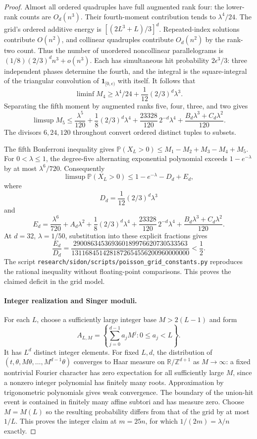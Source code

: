 \documentclass[11pt]{article}
\theoremstyle{definition}
\theoremstyle{remark}
\newcommand{\T}{\mathbb R/\mathbb Z}
\newcommand{\Prob}{\mathbb P}
\begin{document}
\begin{proof}
Almost all ordered quadruples have full augmented rank four: the
lower-rank counts are $O_d(n^3)$. Their fourth-moment contribution
tends to $\lambda^4/24$. The grid's ordered additive energy is
$[(2L^3+L)/3]^d$. Repeated-index solutions contribute $O(n^2)$,
and collinear quadruples contribute $O_d(n^2)$ by the rank-two count.
Thus the number of unordered noncollinear parallelograms is
$(1/8)(2/3)^d n^3+o(n^3)$. Each has simultaneous hit probability
$2\epsilon^3/3$: three independent phases determine the fourth, and
the integral is the square-integral of the triangular convolution of
$\mathbf1_{[0,\epsilon)}$ with itself. It follows that
\[
\liminf M_4\ge\lambda^4/24+
\frac1{12}(2/3)^d\lambda^3.
\]
Separating the fifth moment by augmented ranks five, four, three,
and two gives
\[
\limsup M_5\le\frac{\lambda^5}{120}
+\frac18(2/3)^d\lambda^4
+\frac{23328}{120}\,2^{-d}\lambda^4
+\frac{B_d\lambda^3+C_d\lambda^2}{120}.
\]
The divisors $6,24,120$ throughout convert ordered distinct tuples
to subsets.

The fifth Bonferroni inequality gives
$\Prob(X_L>0)\le M_1-M_2+M_3-M_4+M_5$.
For $0<\lambda\le1$, the degree-five alternating exponential
polynomial exceeds $1-e^{-\lambda}$ by at most $\lambda^6/720$.
Consequently
\[
\limsup\Prob(X_L>0)\le1-e^{-\lambda}-D_d+E_d,
\]
where
\[
D_d=\frac1{12}(2/3)^d\lambda^3
\]
and
\[
E_d=\frac{\lambda^6}{720}+A_d\lambda^2
+\frac18(2/3)^d\lambda^4
+\frac{23328}{120}\,2^{-d}\lambda^4
+\frac{B_d\lambda^3+C_d\lambda^2}{120}.
\]
At $d=32$, $\lambda=1/50$, substitution into these explicit fractions gives
\[
\frac{E_d}{D_d}
=\frac{290086345369360189976620730533563}
{1311684514281872654556200960000000}
<\frac12.
\]
The script \texttt{research/sidon/scripts/poisson\_grid\_constants.py}
reproduces the rational inequality without floating-point comparisons.
This proves the claimed deficit in the grid model.

\paragraph{Integer realization and Singer moduli.}
For each $L$, choose a sufficiently large integer base $M>2(L-1)$
and form
\[
A_{L,M}=\left\{\sum_{j=0}^{d-1}a_jM^j:0\le a_j<L\right\}.
\]
It has $L^d$ distinct integer elements. For fixed $L,d$, the
distribution of $(t,\theta,M\theta,\ldots,M^{d-1}\theta)$ converges
to Haar measure on $\T^{d+1}$ as $M\to\infty$: a fixed nontrivial
Fourier character has zero expectation for all sufficiently large
$M$, since a nonzero integer polynomial has finitely many roots.
Approximation by trigonometric polynomials gives weak convergence.
The boundary of the union-hit event is contained in finitely many
affine subtori and has measure zero. Choose $M=M(L)$ so the resulting
probability differs from that of the grid by at most $1/L$.
This proves the integer claim at $m=25n$, for which
$1/(2m)=\lambda/n$ exactly.


\end{proof}
\end{document}

